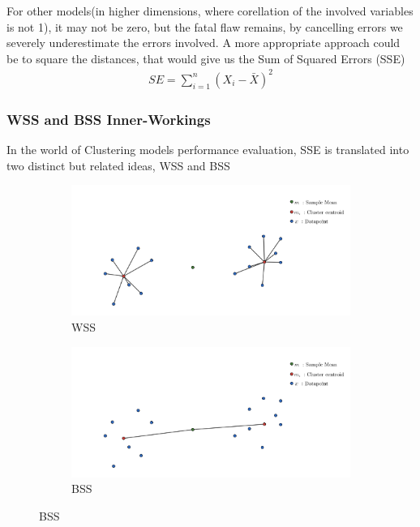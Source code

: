 \documentclass[11pt]{article}
\begin{document}
				\fi
				For other models(in higher dimensions, where corellation of the involved variables is not 1), it may not be zero, but the fatal flaw remains, by cancelling errors we severely underestimate the errors involved. A more appropriate approach could be to square the distances, that would give us the Sum of Squared Errors (SSE)\\
				\iftrue
				\begin{align}
					SE = \sum_{i=1}^{n}{(X_i-\bar{X})}^2
				\end{align}
				\fi
			\subsubsection*{WSS and BSS Inner-Workings}
				In the world of Clustering models performance evaluation, SSE is translated into two distinct but related ideas\cite{???}, WSS and BSS
				\iftrue
				\begin{figure}[H]
					\centering
					\begin{subfigure}{0.4\textwidth}
						\includegraphics[width=\textwidth]{res/t1/t15/t15-WSS}
						\caption{WSS}
						\label{fig:first}
					\end{subfigure}
					\hfill
					\begin{subfigure}{0.4\textwidth}
						\includegraphics[width=\textwidth]{res/t1/t15/t15-BSS}
						\caption{BSS}
						\label{fig:second}
					\end{subfigure}
					\hfill
					\label{fig:figures}
				\end{figure}
				\fi
\end{document}
